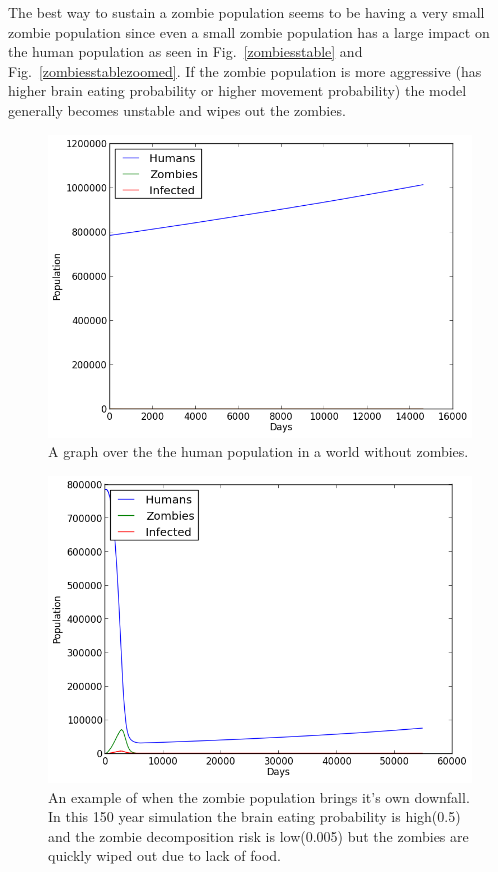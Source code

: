 \documentclass{report}
\begin{document}
The best way to sustain a zombie population seems to be having a very small zombie population since even a small zombie population has a large impact on the human population as seen in Fig.~\ref{zombiesstable} and Fig.~\ref{zombiesstablezoomed}. If the zombie population is more aggressive (has higher brain eating probability or higher movement probability) the model generally becomes unstable and wipes out the zombies.

\begin{figure}
\includegraphics[width=350pt]{plots/withoutzombies}
\caption{A graph over the the human population in a world without zombies.}
\label{withoutzombies}
\end{figure}
\begin{figure}
\includegraphics[width=350pt]{plots/zombieswipedout}
\caption{An example of when the zombie population brings it's own downfall. In this 150 year simulation the brain eating probability is high(0.5) and the zombie decomposition risk is low(0.005) but the zombies are quickly wiped out due to lack of food.}
\label{zombieswipedout}
\end{figure}
\end{document}
